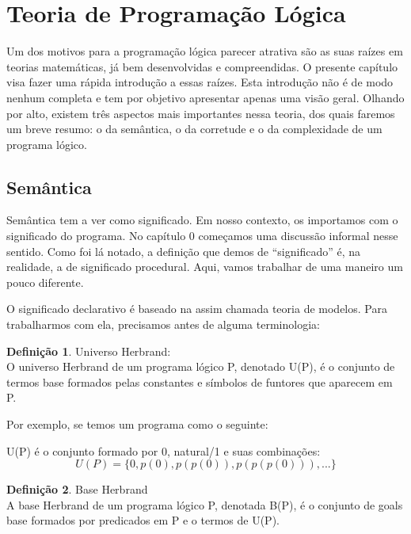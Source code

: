 \documentclass{article}
\theoremstyle{definition}
\newtheorem{definition}{Definição}[section]
\theoremstyle{remark}
\begin{document}
\section{Teoria de Programação Lógica}

Um dos motivos para a programação lógica parecer atrativa são as suas raízes em teorias matemáticas, já bem desenvolvidas e compreendidas. O presente capítulo visa fazer uma rápida introdução a essas raízes. Esta introdução não é de modo nenhum completa e tem por objetivo apresentar apenas uma visão geral. Olhando por alto, existem três aspectos mais importantes nessa teoria, dos quais faremos um breve resumo: o da semântica, o da corretude e o da complexidade de um programa lógico.

\subsection{Semântica}
Semântica tem a ver como significado. Em nosso contexto, os importamos com o significado do programa. No capítulo 0 começamos uma discussão informal nesse sentido. Como foi lá notado, a definição que demos de ``significado'' é, na realidade, a de significado procedural. Aqui, vamos trabalhar de uma maneiro um pouco diferente.

O significado declarativo é baseado na assim chamada teoria de modelos. Para trabalharmos com ela, precisamos antes de alguma terminologia:

\begin{definition}{Universo Herbrand:}
  \\O universo Herbrand de um programa lógico P, denotado U(P), é o conjunto de termos base formados pelas constantes e símbolos de funtores que aparecem em P.
\end{definition}

Por exemplo, se temos um programa como o seguinte:



U(P) é o conjunto formado por 0, natural/1 e suas combinações:
\[
  U(P) = \{0, p(0), p(p(0)), p(p(p(0))), ...\}
\]

\begin{definition}{Base Herbrand}
  \\ A base Herbrand de um programa lógico P, denotada B(P), é o conjunto de goals base formados por predicados em P e o termos de U(P).
\end{definition}
\end{document}
